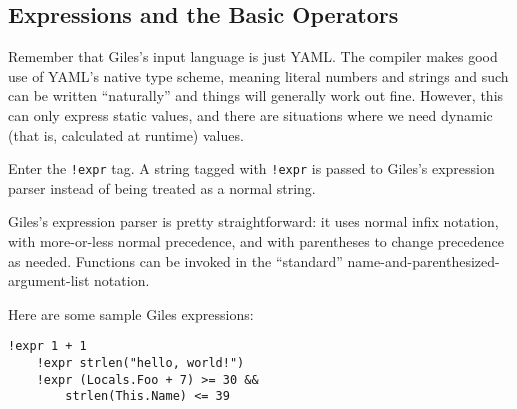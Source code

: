 \documentclass[letterpaper,10pt]{article}
\begin{document}
\subsection{Expressions and the Basic Operators}
Remember that Giles's input language is just YAML.
The compiler makes good use of YAML's native type scheme, meaning literal numbers and strings and such can be written ``naturally'' and things will generally work out fine.
However, this can only express static values, and there are situations where we need dynamic (that is, calculated at runtime) values.

Enter the \texttt{!expr} tag.
A string tagged with \texttt{!expr} is passed to Giles's expression parser instead of being treated as a normal string.

Giles's expression parser is pretty straightforward: it uses normal infix notation, with more-or-less normal precedence, and with parentheses to change precedence as needed.
Functions can be invoked in the ``standard'' name-and-parenthesized-argument-list notation.

Here are some sample Giles expressions:
\begin{lstlisting}[frame=none,numbers=none]
    !expr 1 + 1
    !expr strlen("hello, world!")
    !expr (Locals.Foo + 7) >= 30 &&
        strlen(This.Name) <= 39
\end{lstlisting}
\end{document}
